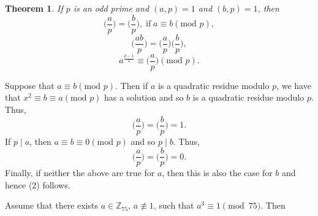 \documentclass{article}
\makeatletter
\newtheorem{theorem}{Theorem}[section]
\theoremstyle{definition}
\theoremstyle{remark}
\let\oldproofname=\proofname
\renewcommand{\proofname}{\textit{\oldproofname}}
\theoremstyle{definition}
\renewenvironment{proof}[1][\proofname]{\par
  \pushQED{\qed}%
  \normalfont \topsep6\p@\@plus6\p@\relax
  \list{}{\leftmargin=0mm
          \rightmargin=0mm
          \settowidth{\itemindent}{\itshape#1}%
          \labelwidth=\itemindent
          \parsep=0pt \listparindent=0mm%
  }
  \item[\hskip\labelsep
        \itshape
    #1\@addpunct{.}]\ignorespaces
}{%
  \popQED\endlist\@endpefalse
}
\makeatother
\begin{document}
    \begin{theorem}\label{thm:4.2}
        If $p$ is an odd prime and $(a,p)=1$ and $(b,p)=1$, then 
            \begin{equation}
                \bigg(\frac{a}{p}\bigg)=\bigg(\frac{b}{p}\bigg),\;\text{if}\; a\equiv b(\text{mod }p),
            \end{equation}
            \begin{equation}
                \bigg(\frac{ab}{p}\bigg)=\bigg(\frac{a}{p}\bigg)\bigg(\frac{b}{p}\bigg),
            \end{equation}
            \begin{equation}
                a^{\frac{p-1}{2}}\equiv\bigg(\frac{a}{p}\bigg)(\text{mod }p).
            \end{equation}
    \end{theorem}
        \begin{proof}
            Suppose that $a\equiv b (\text{mod }p)$. Then if $a$ is a quadratic residue modulo $p$, we have that $x^2\equiv b\equiv a(\text{mod }p)$ has a solution and so $b$ is a quadratic residue modulo $p$. Thus, 
                \begin{equation*}
                    \bigg(\frac{a}{p}\bigg)=\bigg(\frac{b}{p}\bigg)=1.
                \end{equation*}
            If $p\mid a$, then $a\equiv b\equiv 0(\text{mod }p)$ and so $p\mid b$. Thus, 
                \begin{equation*}
                    \bigg(\frac{a}{p}\bigg)=\bigg(\frac{b}{p}\bigg)=0. 
                \end{equation*}
            Finally, if neither the above are true for $a$, then this is also the case for $b$ and hence (2) follows.\par\hspace{4mm} 
        \end{proof}\newpage
    Assume that there exists $a\in\mathbb{Z}_{75}$, $a\not\equiv 1$, such that $a^3\equiv 1\pmod{75}$. Then 
\end{document}
